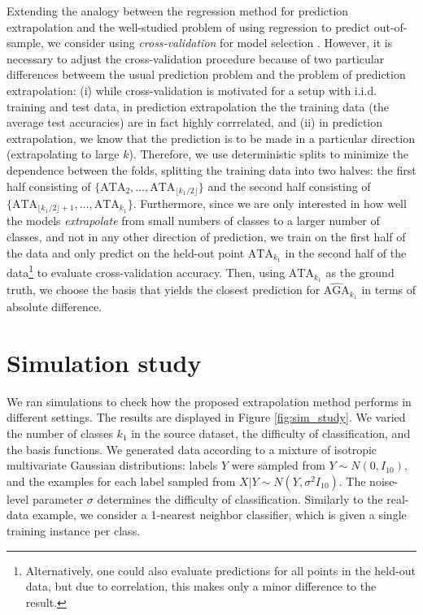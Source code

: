 \documentclass[twoside,11pt]{article}
\begin{document}
Extending the analogy between the regression method for prediction
extrapolation and the well-studied problem of using regression to
predict out-of-sample, we consider using \emph{cross-validation} for
model selection \citep{Hastie2009a}.  However, it is necessary to
adjust the cross-validation procedure because of two particular
differences betweem the usual prediction problem and the problem of
prediction extrapolation: (i) while cross-validation is motivated for
a setup with i.i.d. training and test data, in prediction
extrapolation the the training data (the average test accuracies) are
in fact highly corrrelated, and (ii) in prediction extrapolation, we
know that the prediction is to be made in a particular direction
(extrapolating to large $k$).  Therefore, we use deterministic splits
to minimize the dependence between the folds, splitting the training
data into two halves: the first half consisting of
$\{\text{ATA}_{2},\hdots, \text{ATA}_{\lfloor k_1/2 \rfloor}\}$ and
the second half consisting of $\{\text{ATA}_{\lfloor k_1/2 \rfloor +
  1},\hdots, \text{ATA}_{k_1}\}$.  Furthermore, since we are only
interested in how well the models \emph{extrapolate} from small
numbers of classes to a larger number of classes, and not in any other
direction of prediction, we train on the first half of the data and
only predict on the held-out point $\text{ATA}_{k_1}$ in the second
half of the data\footnote{Alternatively, one could also evaluate
  predictions for all points in the held-out data, but due to
  correlation, this makes only a minor difference to the result.} to
evaluate cross-validation accuracy.  Then, using $\text{ATA}_{k_1}$ as
the ground truth, we choose the basis that yields the closest
prediction for $\hat{\text{AGA}}_{k_1}$ in terms of absolute
difference.

\section{Simulation study}\label{sec:simulation_study}

We ran simulations to check how the proposed extrapolation method
performs in different settings.  The results are displayed in Figure
\ref{fig:sim_study}. 
We varied the number of classes $k_1$ in the
source dataset, the difficulty of classification, and the basis
functions. We generated data according to a mixture of isotropic
multivariate Gaussian distributions: labels $Y$ were sampled from $Y
\sim N(0, I_{10})$, and the examples for each label sampled from $X|Y
\sim N(Y, \sigma^2 I_{10})$. The noise-level parameter $\sigma$
determines the difficulty of classification. Similarly to the
real-data example, we consider a 1-nearest neighbor classifier, which
is given a single training instance per class.
\end{document}
